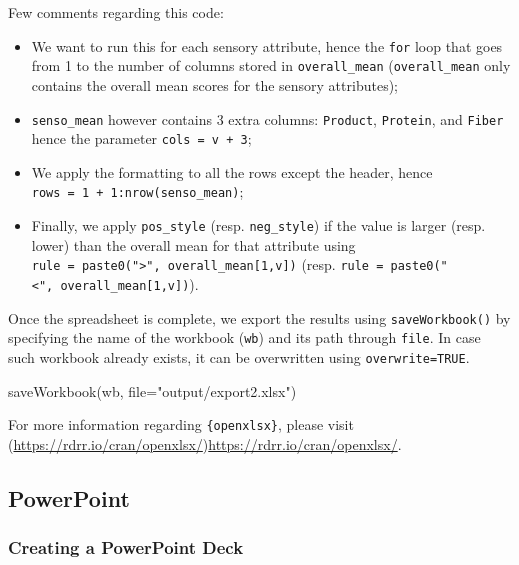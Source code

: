 \documentclass[
]{krantz}
\makeatletter
\newenvironment{Shaded}{\begin{snugshade}}{\end{snugshade}}
\newcommand{\AttributeTok}[1]{\textcolor[rgb]{0.61,0.61,0.61}{#1}}
\newcommand{\FunctionTok}[1]{\textcolor[rgb]{0,0,0}{#1}}
\newcommand{\NormalTok}[1]{#1}
\newcommand{\StringTok}[1]{\textcolor[rgb]{0.5,0.5,0.5}{#1}}
\providecommand{\tightlist}{%
  \setlength{\itemsep}{0pt}\setlength{\parskip}{0pt}}
\newenvironment{kframe}{%
\medskip{}
\setlength{\fboxsep}{.8em}
 \def\at@end@of@kframe{}%
 \ifinner\ifhmode%
  \def\at@end@of@kframe{\end{minipage}}%
  \begin{minipage}{\columnwidth}%
 \fi\fi%
 \def\FrameCommand##1{\hskip\@totalleftmargin \hskip-\fboxsep
 \colorbox{shadecolor}{##1}\hskip-\fboxsep
     \hskip-\linewidth \hskip-\@totalleftmargin \hskip\columnwidth}%
 \MakeFramed {\advance\hsize-\width
   \@totalleftmargin\z@ \linewidth\hsize
   \@setminipage}}%
 {\par\unskip\endMakeFramed%
 \at@end@of@kframe}
\renewenvironment{Shaded}{\begin{kframe}}{\end{kframe}}
\makeatother
\begin{document}
Few comments regarding this code:

\begin{itemize}
\tightlist
\item
  We want to run this for each sensory attribute, hence the \texttt{for} loop that goes from 1 to the number of columns stored in \texttt{overall\_mean} (\texttt{overall\_mean} only contains the overall mean scores for the sensory attributes);
\item
  \texttt{senso\_mean} however contains 3 extra columns: \texttt{Product}, \texttt{Protein}, and \texttt{Fiber} hence the parameter \texttt{cols\ =\ v\ +\ 3};
\item
  We apply the formatting to all the rows except the header, hence \texttt{rows\ =\ 1\ +\ 1:nrow(senso\_mean)};
\item
  Finally, we apply \texttt{pos\_style} (resp. \texttt{neg\_style}) if the value is larger (resp. lower) than the overall mean for that attribute using \texttt{rule\ =\ paste0("\textgreater{}",\ overall\_mean{[}1,v{]})} (resp. \texttt{rule\ =\ paste0("\textless{}",\ overall\_mean{[}1,v{]})}).
\end{itemize}

Once the spreadsheet is complete, we export the results using \texttt{saveWorkbook()} by specifying the name of the workbook (\texttt{wb}) and its path through \texttt{file}. In case such workbook already exists, it can be overwritten using \texttt{overwrite=TRUE}.

\begin{Shaded}
\begin{Highlighting}[]
\FunctionTok{saveWorkbook}\NormalTok{(wb, }\AttributeTok{file=}\StringTok{"output/export2.xlsx"}\NormalTok{)}
\end{Highlighting}
\end{Shaded}

For more information regarding \texttt{\{openxlsx\}}, please visit (\url{https://rdrr.io/cran/openxlsx/})\url{https://rdrr.io/cran/openxlsx/}.

\hypertarget{powerpoint}{%
\subsection{PowerPoint}\label{powerpoint}}

\hypertarget{creating-a-powerpoint-deck}{%
\subsubsection*{Creating a PowerPoint Deck}\label{creating-a-powerpoint-deck}}
\end{document}

